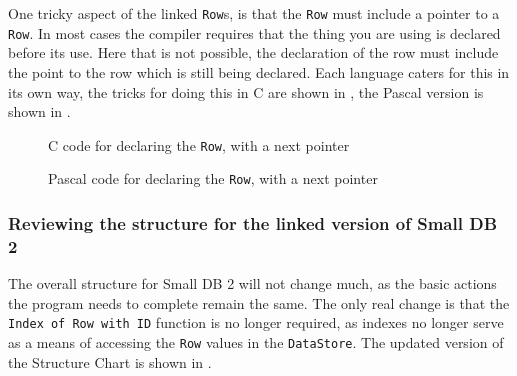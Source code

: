 One tricky aspect of the linked \texttt{Row}s, is that the \texttt{Row} must include a pointer to a \texttt{Row}. In most cases the compiler requires that the thing you are using is declared before its use. Here that is not possible, the declaration of the row must include the point to the row which is still being declared. Each language caters for this in its own way, the tricks for doing this in C are shown in , the Pascal version is shown in .

\begin{figure}[p]
  \caption{C code for declaring the \texttt{Row}, with a next pointer}
  \label{clst:row-node}
\end{figure}
\begin{figure}[p]
  \caption{Pascal code for declaring the \texttt{Row}, with a next pointer}
  \label{paslst:row-node}
\end{figure}

\clearpage
\subsubsection{Reviewing the structure for the linked version of Small DB 2} %
\label{ssub:reviewing_the_structure_for_the_linked_version_of_small_db_2}

The overall structure for Small DB 2 will not change much, as the basic actions the program needs to complete remain the same. The only real change is that the \texttt{Index of Row with ID} function is no longer required, as indexes no longer serve as a means of accessing the \texttt{Row} values in the \texttt{DataStore}. The updated version of the Structure Chart is shown in .

